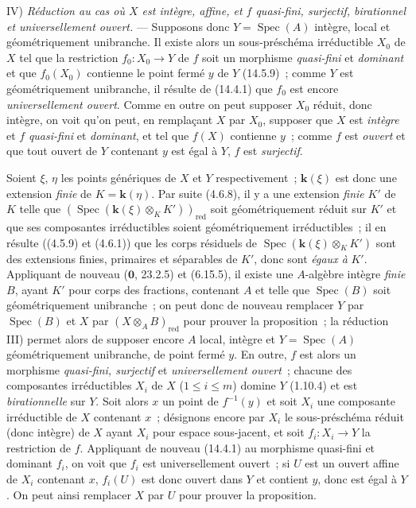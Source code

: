 IV) \emph{Réduction au cas où $X$ est intègre, affine, et $f$ quasi-fini,
surjectif, birationnel et universellement ouvert.} --- Supposons donc $Y=\operatorname{Spec}(A)$
intègre, local et géométriquement unibranche. Il existe alors un sous-préschéma
irréductible $X_0$ de $X$ tel que la restriction $f_0:X_0\to Y$ de $f$ soit un
morphisme \emph{quasi-fini} et \emph{dominant} et que $f_0(X_0)$ contienne le point fermé $y$ de
$Y$ (14.5.9)~; comme $Y$ est géométriquement unibranche, il résulte de (14.4.1) que
$f_0$ est encore \emph{universellement ouvert}. Comme en outre on peut supposer
$X_0$ réduit, donc intègre, on voit qu'on peut, en remplaçant $X$ par $X_0$,
supposer que $X$ est \emph{intègre} et $f$ \emph{quasi-fini} et \emph{dominant}, et tel que
$f(X)$ contienne $y$~; comme $f$ est \emph{ouvert} et que tout ouvert de $Y$
contenant $y$ est égal à $Y$, $f$ est \emph{surjectif}.

Soient $\xi$, $\eta$ les points génériques de $X$ et $Y$ respectivement~;
$\boldsymbol{k}(\xi)$ est donc une extension \emph{finie} de $K=\boldsymbol{k}(\eta)$. Par suite (4.6.8), il
y a une extension \emph{finie} $K'$ de $K$ telle que
$(\operatorname{Spec}(\boldsymbol{k}(\xi)\otimes_K K'))_{\mathrm{red}}$ soit géométriquement réduit sur $K'$ et
que ses composantes irréductibles soient géométriquement irréductibles~; il en
résulte ((4.5.9) et (4.6.1)) que les corps résiduels de
$\operatorname{Spec}(\boldsymbol{k}(\xi)\otimes_K K')$ sont des extensions finies, primaires et séparables de
$K'$, donc sont \emph{égaux à} $K'$. Appliquant de nouveau ($\mathbf 0$, 23.2.5) et
(6.15.5), il existe une $A$-algèbre intègre \emph{finie} $B$, ayant $K'$ pour
corps des fractions, contenant $A$ et telle que $\operatorname{Spec}(B)$ soit géométriquement
unibranche~; on peut donc de nouveau remplacer $Y$ par $\operatorname{Spec}(B)$ et $X$ par
$(X\otimes_A B)_{\mathrm{red}}$ pour prouver la proposition~; la réduction III)
permet alors de supposer encore $A$ local, intègre et $Y=\operatorname{Spec}(A)$ géométriquement
unibranche, de point fermé $y$. En outre, $f$ est alors un morphisme \emph{quasi-fini,
surjectif} et \emph{universellement ouvert}~; chacune des composantes irréductibles $X_i$
de $X$ ($1\leq i\leq m$) domine $Y$ (1.10.4) et est \emph{birationnelle} sur $Y$.
Soit alors $x$ un point de $f^{-1}(y)$ et soit $X_i$ une composante irréductible de
$X$ contenant $x$~; désignons encore par $X_i$ le sous-préschéma réduit (donc
intègre) de $X$ ayant $X_i$ pour espace sous-jacent, et soit $f_i:X_i\to Y$ la
restriction de $f$. Appliquant de nouveau (14.4.1) au morphisme quasi-fini et
dominant $f_i$, on voit que $f_i$ est universellement ouvert~; si $U$ est un ouvert
affine de $X_i$ contenant $x$, $f_i(U)$ est donc
ouvert dans $Y$ et contient $y$, donc est égal à $Y$. On peut ainsi remplacer $X$
par $U$ pour prouver la proposition.

